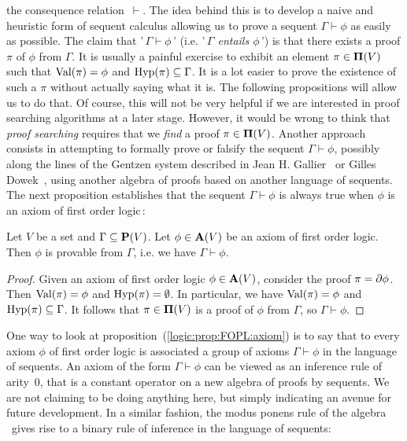 the consequence relation~$\vdash$. The idea behind this is to
develop a naive and heuristic form of sequent calculus allowing us
to prove a sequent $\Gamma\vdash\phi$ as easily as possible. The
claim that '\,$\Gamma\vdash\phi$\,' (i.e. '\,{\em $\Gamma$ entails
$\phi$}\,') is that there exists a proof $\pi$ of $\phi$ from
$\Gamma$. It is usually a painful exercise to exhibit an element
$\pi\in\mbox{${\bf\Pi}(V)$}$ such that $\mbox{\rm Val}(\pi)=\phi$ and
$\mbox{\rm Hyp}(\pi)\subseteq\Gamma$. It is a lot easier to prove the
existence of such a $\pi$ without actually saying what it is. The
following propositions will allow us to do that. Of course, this
will not be very helpful if we are interested in proof searching
algorithms at a later stage. However, it would be wrong to think
that {\em proof searching} requires that we {\em find} a proof
$\pi\in\mbox{${\bf\Pi}(V)$}$. Another approach consists in attempting to formally
prove or falsify the sequent $\Gamma\vdash\phi$, possibly along the
lines of the Gentzen system described in Jean H.
Gallier~\cite{Gallier} or Gilles Dowek~\cite{Dowek}, using another
algebra of proofs based on another language of sequents. The next
proposition establishes that the sequent $\Gamma\vdash\phi$ is
always true when $\phi$ is an axiom of first order logic\,:


\begin{prop}\label{logic:prop:FOPL:axiom}
Let $V$ be a set and $\Gamma\subseteq\mbox{${\bf P}(V)$}$. Let $\phi\in\mbox{${\bf A}(V)$}$ be an
axiom of first order logic. Then $\phi$ is provable from $\Gamma$,
i.e. we have $\Gamma\vdash\phi$.
\end{prop}
\begin{proof}
Given an axiom of first order logic $\phi\in\mbox{${\bf A}(V)$}$, consider the proof
$\pi=\mbox{$\partial$}\phi$. Then $\mbox{\rm Val}(\pi) = \phi$ and $\mbox{\rm Hyp}(\pi)=\emptyset$.
In particular, we have $\mbox{\rm Val}(\pi) = \phi$ and
$\mbox{\rm Hyp}(\pi)\subseteq\Gamma$. It follows that $\pi\in\mbox{${\bf\Pi}(V)$}$ is a proof
of $\phi$ from $\Gamma$, so $\Gamma\vdash\phi$.
\end{proof}

One way to look at proposition~(\ref{logic:prop:FOPL:axiom}) is to
say that to every axiom $\phi$ of first order logic is associated a
group of axioms $\Gamma\vdash\phi$ in the language of sequents. An
axiom of the form $\Gamma\vdash\phi$ can be viewed as an inference
rule of arity~$0$, that is a constant operator on a new algebra of
proofs by sequents. We are not claiming to be doing anything here,
but simply indicating an avenue for future development. In a similar
fashion, the modus ponens rule of the algebra \pvs\ gives rise to a
binary rule of inference in the language of sequents:

